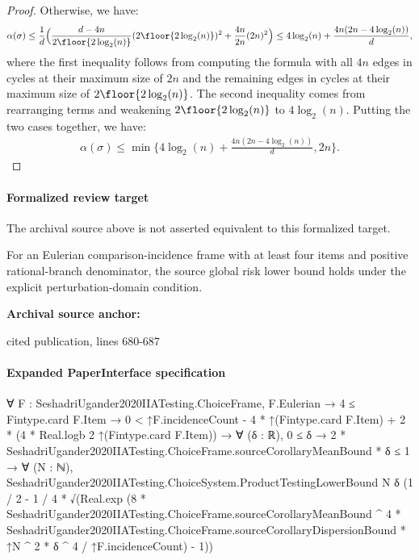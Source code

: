 \documentclass[10pt]{article}
\begin{document}
\begin{ReviewVerbatim}
\begin{proof}
			Otherwise, we have:
			\begin{align*}
			\alpha(\sigma) \leq \frac{1}{d} \Big(\frac{d - 4n}{2\floor{2 \log_2(n)}}(2\floor{2 \log_2(n)})^2 + \frac{4n}{2n}(2n)^2 \Big) \leq 4 \log_2(n) + \frac{4n(2n - 4 \log_2(n))}{d},
			\end{align*}
			where the first inequality follows from computing the formula with all $4n$ edges in cycles at their maximum size of $2n$ and the remaining edges in cycles at their maximum size of $2\floor{2 \log_2(n)}$. The second inequality comes from rearranging terms and weakening $2\floor{2 \log_2(n)}$ to $4 \log_2(n)$. Putting the two cases together, we have:
			\begin{align*}
			\alpha(\sigma) \leq \min \Big\{4 \log_2(n) + \frac{4n(2n - 4 \log_2(n))}{d}, 2n\Big\}.
			\end{align*}
		\end{proof}
\end{ReviewVerbatim}


\paragraph{Formalized review target}
The archival source above is not asserted equivalent to this formalized target.
\begin{ReviewVerbatim}
For an Eulerian comparison-incidence frame with at least four items and positive rational-branch denominator, the source global risk lower bound holds under the explicit perturbation-domain condition.
\end{ReviewVerbatim}

\textbf{Archival source anchor:} {\footnotesize\raggedright cited publication, lines 680-\allowbreak{}687\par}
\paragraph{Expanded PaperInterface specification}
\begin{ReviewVerbatim}
∀ {F : SeshadriUgander2020IIATesting.ChoiceFrame},
  F.Eulerian →
    4 ≤ Fintype.card F.Item →
      0 < ↑F.incidenceCount - 4 * ↑(Fintype.card F.Item) + 2 * (4 * Real.logb 2 ↑(Fintype.card F.Item)) →
        ∀ (δ : ℝ),
          0 ≤ δ →
            2 * SeshadriUgander2020IIATesting.ChoiceFrame.sourceCorollaryMeanBound * δ ≤ 1 →
              ∀ (N : ℕ),
                SeshadriUgander2020IIATesting.ChoiceSystem.ProductTestingLowerBound N δ
                  (1 / 2 -
                    1 / 4 *
                      √(Real.exp
                            (8 * SeshadriUgander2020IIATesting.ChoiceFrame.sourceCorollaryMeanBound ^ 4 *
                                    SeshadriUgander2020IIATesting.ChoiceFrame.sourceCorollaryDispersionBound *
                                  ↑N ^ 2 *
                                δ ^ 4 /
                              ↑F.incidenceCount) -
                          1))
\end{ReviewVerbatim}
\end{document}
